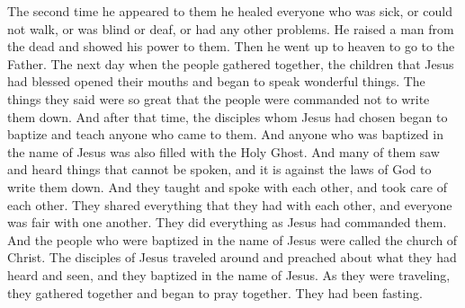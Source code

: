The second time he appeared to them he healed everyone who was sick, or could not walk, or was blind or deaf, or had any other problems. He raised a man from the dead and showed his power to them. Then he went up to heaven to go to the Father.
\bverse \iffalse Behold, it came to pass on the morrow that the multitude gathered themselves together, and they both saw and heard these children; yea, even babes did open their mouths and utter marvelous things; and the things which they did utter were forbidden that there should not any man write them. \fi
The next day when the people gathered together, the children that Jesus had blessed opened their mouths and began to speak wonderful things. The things they said were so great that the people were commanded not to write them down. 
\bverse \iffalse And it came to pass that the disciples whom Jesus had chosen began from that time forth to baptize and to teach as many as did come unto them; and as many as were baptized in the name of Jesus were filled with the Holy Ghost. \fi
And after that time, the disciples whom Jesus had chosen began to baptize and teach anyone who came to them. And anyone who was baptized in the name of Jesus was also filled with the Holy Ghost.
\bverse \iffalse And many of them saw and heard unspeakable things, which are not lawful to be written. \fi
And many of them saw and heard things that cannot be spoken, and it is against the laws of God to write them down.
\bverse \iffalse And they taught, and did minister one to another; and they had all things common among them, every man dealing justly, one with another. \fi
And they taught and spoke with each other, and took care of each other. They shared everything that they had with each other, and everyone was fair with one another.
\bverse \iffalse And it came to pass that they did do all things even as Jesus had commanded them. \fi
They did everything as Jesus had commanded them.
\bverse \iffalse And they who were baptized in the name of Jesus were called the church of Christ. \fi
And the people who were baptized in the name of Jesus were called the church of Christ.
\bchapter
\bverse \iffalse And it came to pass that as the disciples of Jesus were journeying and were preaching the things which they had both heard and seen, and were baptizing in the name of Jesus, it came to pass that the disciples were gathered together and were united in mighty prayer and fasting. \fi
The disciples of Jesus traveled around and preached about what they had heard and seen, and they baptized in the name of Jesus. As they were traveling, they gathered together and began to pray together. They had been fasting.
